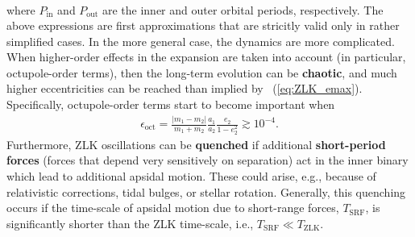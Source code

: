 \documentclass[main.tex]{subfiles}
\begin{document}
\begin{tcolorbox}[sharp corners, colback=blue!30, colframe=blue!80!blue, title=Box \refstepcounter{educhap3}\label{boxchap3:dynV}\ref{boxchap3:dynV} -- Orbital dynamics V]
{\begin{align}
\end{align}
where $P_\mathrm{in}$ and $P_\mathrm{out}$ are the inner and outer orbital periods, respectively. 
The above expressions are first approximations that are stricitly valid only in rather simplified cases. In the more general case, the dynamics are more complicated. When higher-order effects in the expansion are taken into account (in particular, octupole-order terms), then the long-term evolution can be {\bf chaotic}, and much higher eccentricities can be reached than implied by \Eq~(\ref{eq:ZLK_emax}). Specifically, octupole-order terms start to become important when
\begin{align}
\epsilon_\mathrm{oct} = \frac{|m_1-m_2|}{m_1+m_2} \frac{a_1}{a_2} \frac{e_2}{1-e_2^2} \gtrsim 10^{-4}.
\end{align}
Furthermore, ZLK oscillations can be {\bf quenched} if additional {\bf short-period forces} (forces that depend very sensitively on separation) act in the inner binary which lead to additional apsidal motion. These could arise, e.g., because of relativistic corrections, tidal bulges, or stellar rotation. Generally, this quenching occurs if the time-scale of apsidal motion due to short-range forces, $T_\mathrm{SRF}$, is significantly shorter than the ZLK time-scale, i.e., $T_\mathrm{SRF} \ll T_\mathrm{ZLK}$. 
}  
\end{tcolorbox}
\end{document}
